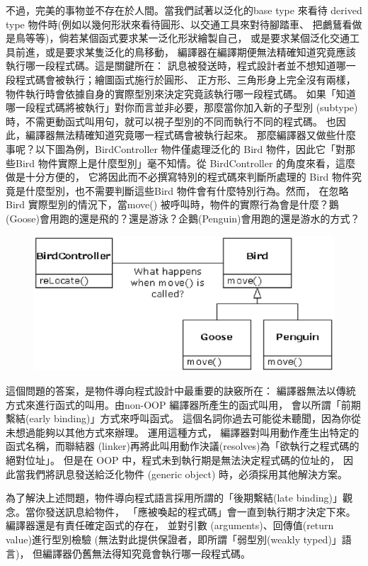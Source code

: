 不過，完美的事物並不存在於人間。當我們試著以泛化的base type 來看待
derived type 物件時(例如以幾何形狀來看待圓形、以交通工具來對待腳踏車、
把鸕鶿看做是鳥等等)，倘若某個函式要求某一泛化形狀繪製自己，
或是要求某個泛化交通工具前進，或是要求某隻泛化的鳥移動，
編譯器在編譯期便無法精確知道究竟應該執行哪一段程式碼。這是關鍵所在：
訊息被發送時，程式設計者並不想知道哪一段程式碼會被執行；繪圖函式施行於圓形、
正方形、三角形身上完全沒有兩樣，
物件執行時會依據自身的實際型別來決定究竟該執行哪一段程式碼。
如果「知道哪一段程式碼將被執行」對你而言並非必要，那麼當你加入新的子型別
(subtype)時，不需更動函式叫用句，就可以視子型別的不同而執行不同的程式碼。
也因此，編譯器無法精確知道究竟哪一程式碼會被執行起來。
那麼編譯器又做些什麼事呢？以下圖為例，BirdController 物件僅處理泛化的
Bird 物件，因此它「對那些Bird 物件實際上是什麼型別」毫不知情。從
BirdController 的角度來看，這麼做是十分方便的，
它將因此而不必撰寫特別的程式碼來判斷所處理的
Bird 物件究竟是什麼型別，也不需要判斷這些Bird 物件會有什麼特別行為。然而，
在忽略Bird 實際型別的情況下，當move() 被呼叫時，物件的實際行為會是什麼？鵝
(Goose)會用跑的還是飛的？還是游泳？企鵝(Penguin)會用跑的還是游水的方式？

\begin{figure}[htbp]
\centering
\includegraphics[scale=0.8]{eps/TIJ210.eps}
\end{figure}

這個問題的答案，是物件導向程式設計中最重要的訣竅所在：
編譯器無法以傳統方式來進行函式的叫用。由non-OOP 編譯器所產生的函式叫用，
會以所謂「前期繫結(early binding)」方式來呼叫函式。
這個名詞你過去可能從未聽聞，因為你從未想過能夠以其他方式來辦理。
運用這種方式， 編譯器對叫用動作產生出特定的函式名稱，而聯結器
(linker)再將此叫用動作決議(resolves)為「欲執行之程式碼的絕對位址」。
但是在 OOP 中，程式未到執行期是無法決定程式碼的位址的，
因此當我們將訊息發送給泛化物件 (generic object) 時，必須採用其他解決方案。

為了解決上述問題，物件導向程式語言採用所謂的「後期繫結(late
binding)」觀念。當你發送訊息給物件，
「應被喚起的程式碼」會一直到執行期才決定下來。編譯器還是有責任確定函式的存在，
並對引數 (arguments)、回傳值(return value)進行型別檢驗
(無法對此提供保證者，即所謂「弱型別(weakly typed)」語言)，
但編譯器仍舊無法得知究竟會執行哪一段程式碼。

